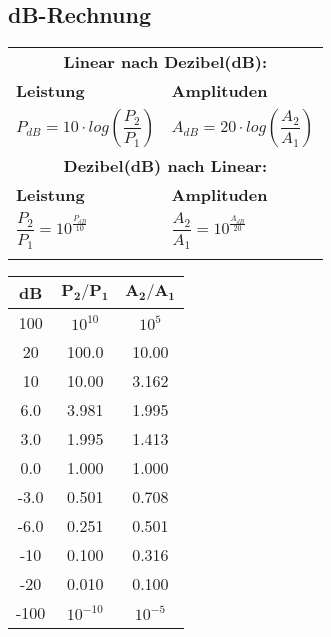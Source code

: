 \subsection{dB-Rechnung}
\begin{minipage}[t]{0.48\textwidth}
	\renewcommand{\arraystretch}{1.5}
	\begin{tabular}{|ll|}
		\hline
		\multicolumn{2}{|c|}{\textbf{Linear nach Dezibel(dB):}}\\
		\textbf{Leistung} & \textbf{Amplituden}\\
		$P_{dB} = 10 \cdot log\left(\dfrac{P_2}{P_1}\right)$ & $A_{dB} = 20 \cdot log\left(\dfrac{A_2}{A_1}\right)$\\
		\multicolumn{2}{|c|}{\textbf{Dezibel(dB) nach Linear:}}\\
		\textbf{Leistung} & \textbf{Amplituden}\\
		$\dfrac{P_2}{P_1} = 10^{\frac{P_{dB}}{10}}$ & $\dfrac{A_2}{A_1} = 10^{\frac{A_{dB}}{20}}$\\
		\quad & \quad\\
		\hline
	\end{tabular}
	\renewcommand{\arraystretch}{1}
\end{minipage}
%
\hspace{0.04\textwidth}
%
\begin{minipage}[t]{0.48\textwidth}
	\renewcommand{\arraystretch}{1.3}
	\begin{tabular}{|c|c|c|}
		\hline
		\textbf{dB} & $\mathbf{P_2/P_1}$ & $\mathbf{A_2/A_1}$\\
		\hline
		100  & $10^{10}$ & $10^{5}$\\
		20   & 100.0 & 10.00\\
		10   & 10.00 & 3.162\\
		6.0  & 3.981 & 1.995\\
		3.0  & 1.995 & 1.413\\
		0.0  & 1.000 & 1.000\\
		-3.0 & 0.501 & 0.708\\
		-6.0 & 0.251 & 0.501\\
		-10  & 0.100 & 0.316\\
		-20  & 0.010 & 0.100\\
		-100  & $10^{-10}$ & $10^{-5}$\\
		\hline		
	\end{tabular}
\renewcommand{\arraystretch}{1}
\end{minipage}
